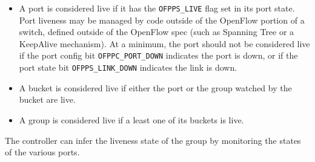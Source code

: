 \documentclass[10pt]{article}
\begin{document}
\begin{itemize}
\item A port is considered live if it has the \verb|OFPPS_LIVE| flag set in its port state.  Port liveness may be managed by code outside of the OpenFlow portion of a switch, defined outside of the OpenFlow spec (such as Spanning Tree or a KeepAlive mechanism).  At a minimum, the port should not be considered live if the port config bit \verb|OFPPC_PORT_DOWN| indicates the port is down, or if the port state bit \verb|OFPPS_LINK_DOWN| indicates the link is down.
\item A bucket is considered live if either the port or the group watched by the bucket are live.
\item A group is considered live if a least one of its buckets is live.
\end{itemize}

The controller can infer the liveness state of the group by monitoring the states of the various ports.

\appendixtitleon
\begin{appendices}



\end{appendices}
 
\end{document}
